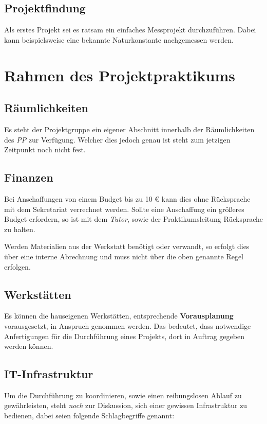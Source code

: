 \documentclass[%
fontsize=12pt,
paper=a4,
DIV=calc,
]{scrartcl}
\begin{document}
\subsection{Projektfindung}
Als erstes Projekt sei es ratsam ein einfaches Messprojekt durchzuführen. Dabei kann beispielsweise eine bekannte Naturkonstante nachgemessen werden.

\section{Rahmen des Projektpraktikums}

\subsection{Räumlichkeiten}
Es steht der Projektgruppe ein eigener Abschnitt innerhalb der Räumlichkeiten des \emph{PP} zur Verfügung. Welcher dies jedoch genau ist steht zum jetzigen Zeitpunkt noch nicht fest.

\subsection{Finanzen}
Bei Anschaffungen von einem Budget bis zu 10 € kann dies ohne Rücksprache mit dem Sekretariat verrechnet werden. Sollte eine Anschaffung ein größeres Budget erfordern, so ist mit dem \emph{Tutor}, sowie der Praktikumsleitung Rücksprache zu halten.\par
Werden Materialien aus der Werkstatt benötigt oder verwandt, so erfolgt dies über eine interne Abrechnung und muss nicht über die oben genannte Regel erfolgen.

\subsection{Werkstätten}
Es können die hauseigenen Werkstätten, entsprechende \textbf{Vorausplanung} vorausgesetzt, in Anspruch genommen werden. Das bedeutet, dass notwendige Anfertigungen für die Durchführung eines Projekts, dort in Auftrag gegeben werden können. 

\subsection{IT-Infrastruktur}
Um die Durchführung zu koordinieren, sowie einen reibungslosen Ablauf zu gewährleisten, steht \emph{noch} zur Diskussion, sich einer gewissen Infrastruktur zu bedienen, dabei seien folgende Schlagbegriffe genannt:
\end{document}
